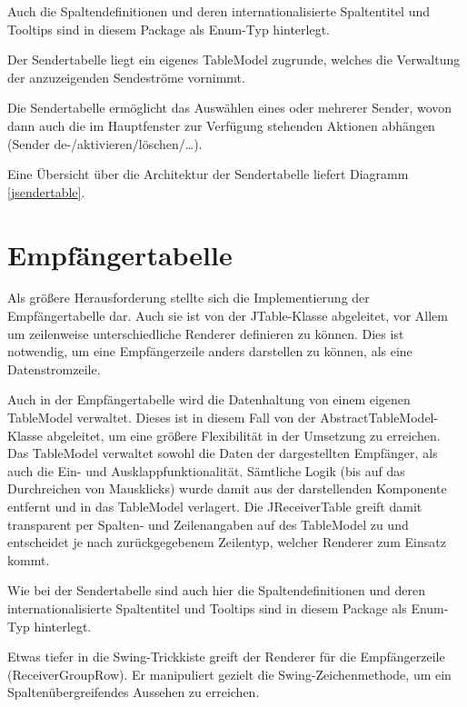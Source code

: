         Auch die Spaltendefinitionen und deren internationalisierte Spaltentitel
        und Tooltips sind in diesem Package als Enum-Typ hinterlegt.
        
        Der Sendertabelle liegt ein eigenes TableModel zugrunde, welches die
        Verwaltung der anzuzeigenden Sendeströme vornimmt.
        
        Die Sendertabelle ermöglicht das Auswählen eines oder mehrerer Sender,
        wovon dann auch die im Hauptfenster zur Verfügung stehenden Aktionen
        abhängen (Sender de-/aktivieren/löschen/\ldots).
        
        Eine Übersicht über die Architektur der Sendertabelle liefert Diagramm
        \ref{jsendertable}.
    
    \section{Empfängertabelle}
    
        Als größere Herausforderung stellte sich die Implementierung der
        Empfängertabelle dar. Auch sie ist von der JTable-Klasse abgeleitet, vor
        Allem um zeilenweise unterschiedliche Renderer definieren zu können.
        Dies ist notwendig, um eine Empfängerzeile anders darstellen zu können,
        als eine Datenstromzeile.
        
        Auch in der Empfängertabelle wird die Datenhaltung von einem eigenen
        TableModel verwaltet. Dieses ist in diesem Fall von der
        AbstractTableModel-Klasse abgeleitet, um eine größere Flexibilität in
        der Umsetzung zu erreichen. Das TableModel verwaltet sowohl die Daten
        der dargestellten Empfänger, als auch die Ein- und
        Ausklappfunktionalität. Sämtliche Logik (bis auf das Durchreichen von
        Mausklicks) wurde damit aus der darstellenden Komponente entfernt und in
        das TableModel verlagert. Die JReceiverTable greift damit transparent
        per Spalten- und Zeilenangaben auf des TableModel zu und entscheidet je
        nach zurückgegebenem Zeilentyp, welcher Renderer zum Einsatz kommt.
        
        Wie bei der Sendertabelle sind auch hier die Spaltendefinitionen und deren internationalisierte Spaltentitel
        und Tooltips sind in diesem Package als Enum-Typ hinterlegt.
        
        Etwas tiefer in die Swing-Trickkiste greift der Renderer für die
        Empfängerzeile (ReceiverGroupRow). Er manipuliert gezielt die
        Swing-Zeichenmethode, um ein Spaltenübergreifendes Aussehen zu
        erreichen.
        
